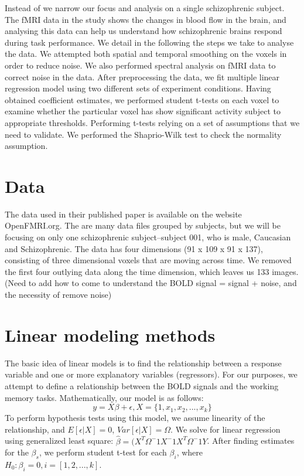 \documentclass[11pt]{article} \usepackage{graphicx} \graphicspath{ {images/} }
\begin{document}
Instead of we narrow our focus and analysis on a single schizophrenic
subject. The fMRI data in the study shows the changes in
blood flow in the brain, and analysing this data can help us understand how
schizophrenic brains respond during task performance. We detail in the following the steps
we take to analyse the data. We attempted both spatial and temporal smoothing on
the voxels in order to reduce noise. We also performed spectral analysis on fMRI data to
correct noise in the data. After preprocessing the data, we fit
multiple linear regression model using two different sets of experiment
conditions. Having obtained coefficient estimates, we performed student t-tests
on each voxel to examine whether the particular voxel has show significant
activity subject to appropriate thresholds. Performing t-tests relying on a set
of assumptions that we need to validate. We performed the Shaprio-Wilk test to
check the normality assumption.

\section{Data}

The data used in their published paper is available on the website OpenFMRI.org.
The are many data files grouped by subjects, but we will be focusing on only one
schizophrenic subject--subject 001, who is male, Caucasian and Schizophrenic.
The data has four dimensions (91 x 109 x 91 x 137), consisting of three dimensional voxels that are moving
across time. We removed the first four outlying data along the time dimension,
which leaves us 133 images. (Need to add how to come to understand the BOLD
signal = signal + noise, and the necessity of remove noise)

\section{Linear modeling methods} 

The basic idea of linear models is to find the relationship between a response
variable and one or more explanatory variables (regressors). For our purposes,
we attempt to define a relationship between the BOLD signals and the working
memory tasks. Mathematically, our model is as follows:
 $$ y = X \beta + \epsilon, X = \{1, x_1, x_2, ..., x_k\}$$ To perform
 hypothesis tests using this model, we assume linearity of the relationship, and
 $E [\epsilon | X ] = 0$, $Var [ \epsilon | X ] = \Omega$. We solve for linear
 regression using generalized least square: $\hat{\beta} = (X^T \Omega^-1 X^-1
 X^T \Omega^-1 Y$. After finding estimates for the $\beta_s$, we perform student
 t-test for each $\beta_i$, where $H_0: \beta_i = 0, i = [1, 2, ..., k]$.
\end{document}
